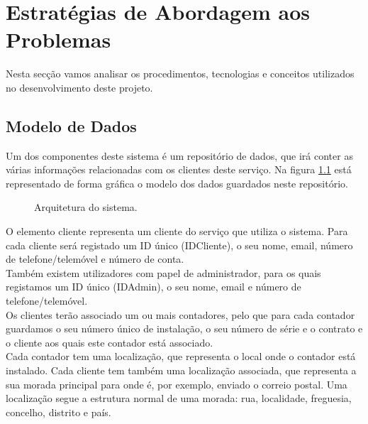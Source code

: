 \chapter{Estratégias de Abordagem aos Problemas} \label{cap:abordagem}
Nesta secção vamos analisar os procedimentos, tecnologias e conceitos utilizados no desenvolvimento deste projeto.

\section{Modelo de Dados} \label{sec:dados}
Um dos componentes deste sistema é um repositório de dados, que irá conter as várias informações relacionadas com os clientes deste serviço. Na figura \ref{fig:relacoes} está representado de forma gráfica o modelo dos dados guardados neste repositório. \\

\begin{figure}[ht!]
\centering
{}
\caption{Arquitetura do sistema.}
\label{fig:relacoes}
\end{figure}

O elemento cliente representa um cliente do serviço que utiliza o sistema. Para cada cliente será registado um ID único (IDCliente), o seu nome, email, número de telefone/telemóvel e número de conta. \\
Também existem utilizadores com papel de administrador, para os quais registamos um ID único (IDAdmin), o seu nome, email e número de telefone/telemóvel. \\
Os clientes terão associado um ou mais contadores, pelo que para cada contador guardamos o seu número único de instalação, o seu número de série e o contrato e o cliente aos quais este contador está associado. \\
Cada contador tem uma localização, que representa o local onde o contador está instalado. Cada cliente tem também uma localização associada, que representa a sua morada principal para onde é, por exemplo, enviado o correio postal. Uma localização segue a estrutura normal de uma morada: rua, localidade, freguesia, concelho, distrito e país.

